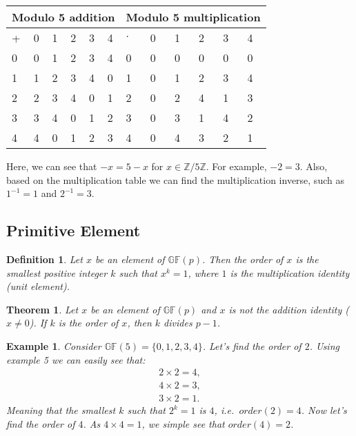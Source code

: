 \documentclass[12pt]{article}
\newtheorem{theorem}{Theorem}
\newtheorem{example}{Example}
\newtheorem{definition}{Definition}
\newcommand{\Zn}[1]{\mathds{Z}/#1\mathds{Z}}
\newcommand{\gf}[1]{\mathds{GF}\left(#1\right)} %
\begin{document}
\begin{table}[h!]
	\centering
	\begin{tabular}{|m{1.5em}|m{1.5em}|m{1.5em}|m{1.5em}|m{1.5em}|m{1.5em}||m{1.5em}|m{1.5em}|m{1.5em}|m{1.5em}|m{1.5em}|m{1.5em}|}
		 
		\multicolumn{6}{c||}{Modulo 5 addition} &   \multicolumn{6}{c}{Modulo 5 multiplication}\\  [0.5ex]
		\hline\hline 
		+ & 0 & 1 & 2 & 3 & 4 & $\cdot$ & 0 & 1 & 2 & 3 & 4 \\ 
		\hline 
		0 & 0 & 1 & 2 & 3 & 4 & 0 & 0 & 0 & 0 & 0 & 0\\ 
		\hline 
		 1 & 1 & 2 & 3 & 4 & 0 & 1 & 0 & 1 & 2 & 3 & 4\\ 
		\hline 
		2 & 2 & 3 & 4 & 0 & 1 & 2 & 0 & 2 & 4 & 1 & 3 \\ 
		\hline 
		3 & 3 & 4 & 0 & 1 & 2 & 3 & 0 & 3 & 1 & 4 & 2\\ 
		\hline 
		4 & 4 & 0 & 1 & 2 & 3 & 4 & 0 & 4 & 3 & 2 & 1\\ 
		\hline 
	\end{tabular} 
\end{table}

Here, we can see that $-x = 5 - x$ for $x\in\Zn{5}$. For example, $-2 = 3$. Also, based on the multiplication table we can find the multiplication inverse, such as $1^{-1} = 1$ and $2^{-1} = 3$. 


\subsection{Primitive Element}


\begin{definition}
	Let $x$ be an element of $\gf{p}$. Then the order of $x$ is the smallest positive integer $k$ such that $x^k=1$, where $1$ is the multiplication identity (unit element). 
\end{definition}

\begin{theorem}
	Let $x$ be an element of $\gf{p}$ and $x$ is not the addition identity ($x\neq0$). If $k$ is the order of $x$, then $k$ divides $p-1$. 
\end{theorem}

\begin{example}
	Consider $\gf{5} = \{0,1,2,3,4\}$. Let's find the order of $2$. Using example 5 we can easily see that: 
	\begin{align*}
		2\times 2 = 4, \\
		4\times 2 = 3, \\
		3\times 2 = 1.
	\end{align*} 
	Meaning that the smallest $k$ such that $2^k = 1$ is $4$, i.e.\ $order(2) = 4$. Now let's find the order of $4$. As $4\times 4 = 1$, we simple see that $order(4) = 2$. 
\end{example}
\end{document}
